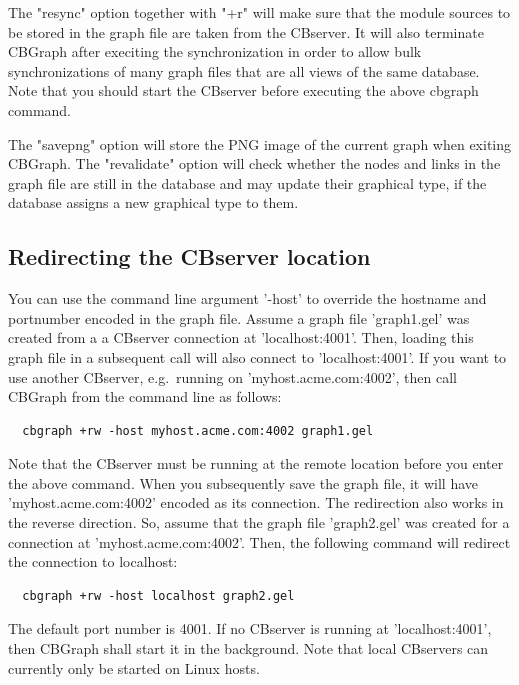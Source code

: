 The "resync" option together with "+r" will make sure that the module sources to be stored in the graph file
are taken from the CBserver. It will also terminate CBGraph after execiting the synchronization in order to
allow bulk synchronizations of many graph files that are all views of the same database. Note that you should
start the CBserver before executing the above cbgraph command.

The "savepng" option will store the PNG image of the current graph when exiting CBGraph. The "revalidate" option
will check whether the nodes and links in the graph file are still in the database and may update their graphical
type, if the database assigns a new graphical type to them.


\subsection{Redirecting the CBserver location}

You can use the command line argument '-host' to override the hostname and portnumber encoded in
the graph file. Assume a graph file 'graph1.gel' was created from a a CBserver connection
at 'localhost:4001'.
Then, loading this graph file in a subsequent call will also connect to 'localhost:4001'. If you
want to use another CBserver, e.g.\ running on 'myhost.acme.com:4002', then call CBGraph 
from the command line as follows:

{\small
\begin{verbatim}
  cbgraph +rw -host myhost.acme.com:4002 graph1.gel
\end{verbatim}
}

Note that the CBserver must be running at the remote location before you enter the above command.
When you subsequently save the graph file, it will have 'myhost.acme.com:4002' encoded as its
connection. The redirection also works in the reverse direction. So, assume that the graph file
'graph2.gel'  was created for a connection at 'myhost.acme.com:4002'. Then, the following command
will redirect the connection to localhost:

{\small
\begin{verbatim}
  cbgraph +rw -host localhost graph2.gel
\end{verbatim}
}

The default port number is 4001. If no CBserver is running at 'localhost:4001', then CBGraph shall start
it in the background. Note that local CBservers can currently only be started on Linux hosts.



